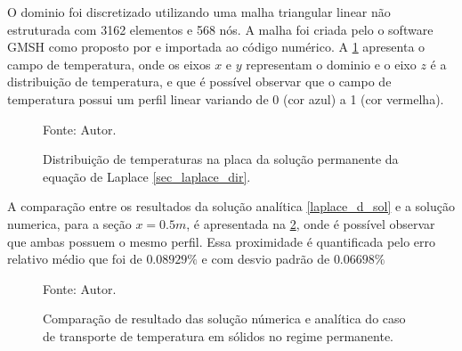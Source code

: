 O dominio foi discretizado utilizando uma malha triangular linear não estruturada com 3162 elementos e 568 nós.
A malha foi criada pelo o software GMSH como proposto por \cite{gmsh} e importada ao código numérico.
A \ref{laplace_d_3d} apresenta o campo de temperatura, onde os eixos $x$ e $y$ representam o dominio e o eixo $z$ é a distribuição de temperatura, e que é possível observar que o campo de temperatura possui um perfil linear variando de 0 (cor azul) a 1 (cor vermelha).
\begin{figure}[H]
    \centering
     {\raggedleft \scriptsize Fonte: Autor.}
    \caption{Distribuição de temperaturas na placa da solução permanente da equação de Laplace \ref{sec_laplace_dir}.}
    \label{laplace_d_3d}
\end{figure}

A comparação entre os resultados da solução analítica \eqref{laplace_d_sol} e a solução numerica, para a seção $x=0.5m$, é apresentada na \ref{laplace_d_perm_comp}, onde é possível observar que ambas possuem o mesmo perfil.
Essa proximidade é quantificada pelo erro relativo médio que foi de $0.08929\%$ e com desvio padrão de $0.06698\%$
\begin{figure}[H]
    \centering
     {\raggedleft \scriptsize Fonte: Autor.}
    \caption{Comparação de resultado das solução númerica e analítica do caso de transporte de temperatura em sólidos no regime permanente.}
    \label{laplace_d_perm_comp}
\end{figure}


